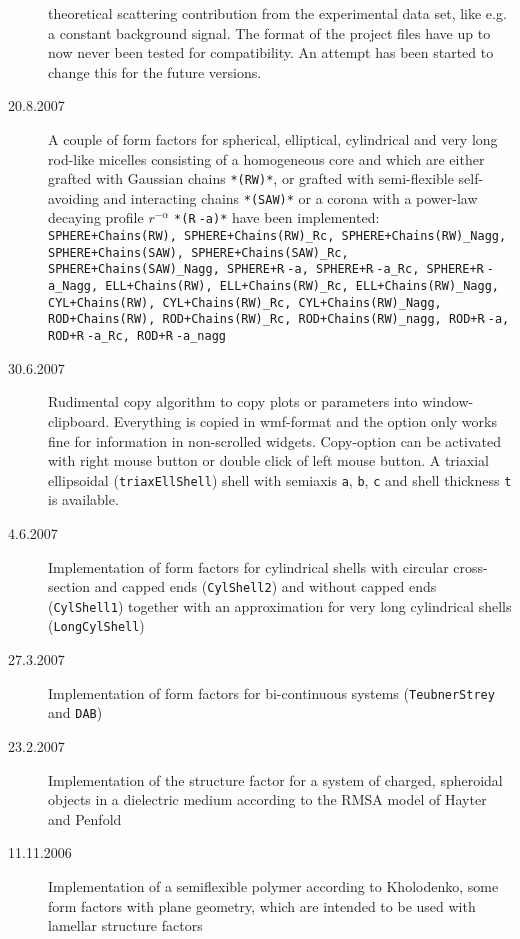 \begin{description}
    theoretical scattering contribution from the experimental data set, like e.g. a constant background signal.
    The format of the project files have up to now never been tested for compatibility. An attempt has
    been started to change this for the future versions.
    \item[20.8.2007] A couple of form factors for spherical, elliptical, cylindrical and very long rod-like
    micelles consisting of a homogeneous core and which are either grafted with Gaussian chains \texttt{*(RW)*},
    or grafted with semi-flexible self-avoiding and interacting chains \texttt{*(SAW)*} or
    a corona with a power-law decaying profile $r^{-\alpha}$ \texttt{*(R$\hat{~}$-a)*}
    have been implemented:
    \texttt{
    SPHERE+Chains(RW), SPHERE+Chains(RW)\_Rc, SPHERE+Chains(RW)\_Nagg,
    SPHERE+Chains(SAW), SPHERE+Chains(SAW)\_Rc, SPHERE+Chains(SAW)\_Nagg,
    SPHERE+R$\hat{~}$-a, SPHERE+R$\hat{~}$-a\_Rc, SPHERE+R$\hat{~}$-a\_Nagg,
    ELL+Chains(RW), ELL+Chains(RW)\_Rc, ELL+Chains(RW)\_Nagg,
    CYL+Chains(RW), CYL+Chains(RW)\_Rc, CYL+Chains(RW)\_Nagg,
    ROD+Chains(RW), ROD+Chains(RW)\_Rc, ROD+Chains(RW)\_nagg,
    ROD+R$\hat{~}$-a, ROD+R$\hat{~}$-a\_Rc, ROD+R$\hat{~}$-a\_nagg
    }
    \item[30.6.2007] Rudimental copy algorithm to copy plots or parameters into window-clipboard. Everything
    is copied in wmf-format and the option only works fine for information in non-scrolled widgets.
    Copy-option can be activated with right mouse button or double click of left mouse button.
    A triaxial ellipsoidal (\texttt{triaxEllShell}) shell with semiaxis \texttt{a}, \texttt{b}, \texttt{c}
    and shell thickness \texttt{t} is available.
    \item[4.6.2007] Implementation of form factors for cylindrical shells with circular cross-section and capped ends
    (\texttt{CylShell2}) and without capped ends (\texttt{CylShell1}) together with an approximation for very long
    cylindrical shells (\texttt{LongCylShell})
    \item[27.3.2007] Implementation of form factors for bi-continuous systems (\texttt{TeubnerStrey} and \texttt{DAB})
    \item[23.2.2007] Implementation of the structure factor for a system of charged, spheroidal objects in a
    dielectric medium according to the RMSA model of Hayter and Penfold
    \item[11.11.2006]  Implementation of a semiflexible polymer according to Kholodenko,
    some form factors with plane geometry, which are intended to be used with lamellar structure factors

\end{description}
